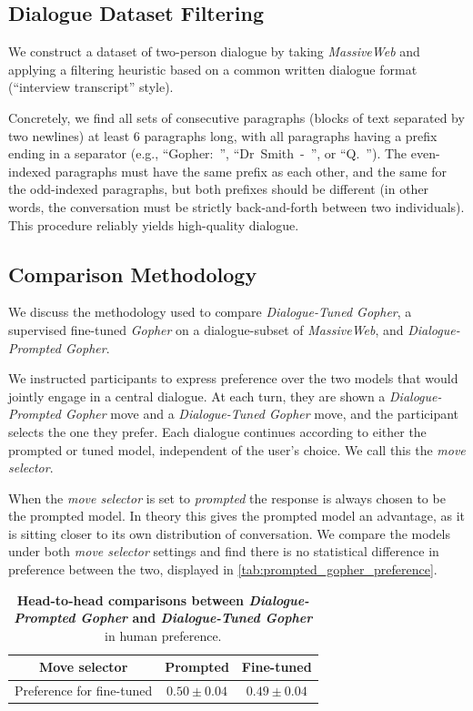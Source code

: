\documentclass[11pt, a4paper, logo, internal, copyright, nonumbering]{deepmind}
\newcommand{\massiveweb}{\textit{MassiveWeb}\xspace}
\newcommand{\gopher}{\textit{Gopher}\xspace}
\newcommand{\gopherchat}{\textit{Dialogue-Prompted Gopher}\xspace}
\newcommand{\gopherchatsl}{\textit{Dialogue-Tuned Gopher}\xspace}
\begin{document}
\subsection{Dialogue Dataset Filtering}
\label{app:dialogue_data}
We construct a dataset of two-person dialogue by taking \massiveweb and applying a filtering heuristic based on a common written dialogue format (``interview transcript'' style). 

Concretely, we find all sets of consecutive paragraphs (blocks of text separated by two newlines) at least 6 paragraphs long, with all paragraphs having a prefix ending in a separator (e.g., \mbox{``Gopher: ''}, \mbox{``Dr Smith - ''}, or \mbox{``Q. ''}). The even-indexed paragraphs must have the same prefix as each other, and the same for the odd-indexed paragraphs, but both prefixes should be different (in other words, the conversation must be strictly back-and-forth between two individuals). This procedure reliably yields high-quality dialogue.

\subsection{Comparison Methodology}
\label{app:gopherchat_methodology}
We discuss the methodology used to compare \gopherchatsl, a supervised fine-tuned \gopher on a dialogue-subset of \massiveweb, and \gopherchat.

We instructed participants to express preference over the two models that would jointly engage in a central dialogue. At each turn, they are shown a \gopherchat move and a \gopherchatsl move, and the participant selects the one they prefer. Each dialogue continues according to either the prompted or tuned model, independent of the user's choice. We call this the \textit{move selector}.

When the \textit{move selector} is set to \textit{prompted} the response is always chosen to be the prompted model. In theory this gives the prompted model an advantage, as it is sitting closer to its own distribution of conversation. We compare the models under both \textit{move selector} settings and find there is no statistical difference in preference between the two, displayed in \autoref{tab:prompted_gopher_preference}.

\begin{table}[H]
\centering
\begin{tabular}{c|c|c}
\textbf{Move selector} & Prompted  & Fine-tuned \\
\midrule
Preference for fine-tuned & $0.50 \pm 0.04$ & $0.49 \pm 0.04$ \\

\end{tabular}
\caption{\textbf{Head-to-head comparisons between \gopherchat and \gopherchatsl} in human preference.}
\label{tab:prompted_gopher_preference}
\end{table}
\end{document}
